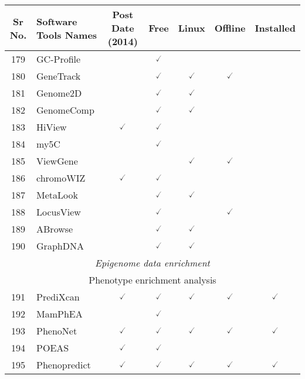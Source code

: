 \documentclass[10pt,letterpaper]{article}
\begin{document}
\begin{table}[!ht]
\begin{adjustwidth}{-2.25in}{0in} %
\centering
\begin{tabular}{|c|l|c|c|c|c|c|}
\hline
Sr No. & Software Tools Names & Post Date (2014) & Free & Linux & Offline & Installed \\ \hline
\hline
179 & GC-Profile\cite{gao2006gc} & & $\checked$ & & &  \\ 
180 & GeneTrack\cite{albert2008genetrack} & & $\checked$ & $\checked$ & $\checked$ &  \\ 
181 & Genome2D\cite{baerends2004genome2d} & & $\checked$ & $\checked$ & & \\
182 & GenomeComp\cite{yang2003genomecomp} & & $\checked$ & $\checked$ & & \\
183 & HiView\cite{xu2016hiview} & $\checked$ & $\checked$ & & & \\
184 & my5C\cite{lajoie2009my5c} & & $\checked$ & & & \\
185 & ViewGene\cite{kashuk2002viewgene} & & & $\checked$ & $\checked$ & \\
186 & chromoWIZ\cite{nussbaumer2014chromowiz} & $\checked$ & $\checked$ & & & \\
187 & MetaLook\cite{lombardot2007metalook} & & $\checked$ & $\checked$ & & \\
188 & LocusView\cite{smoller2008influence} & & $\checked$ & & $\checked$ & \\
189 & ABrowse\cite{kong2012abrowse} & & $\checked$ & $\checked$ & & \\
190 & GraphDNA\cite{thomas2007graphdna} & & $\checked$ & $\checked$ & & \\ \hline
\hline
\multicolumn{7}{|c|}{\textit{Epigenome data enrichment}} \\ \hline
\hline
\multicolumn{7}{|c|}{Phenotype enrichment analysis} \\ \hline
\hline
191 & PrediXcan\cite{gamazon2015gene} & $\checked$ & $\checked$ & $\checked$ & $\checked$ & $\checked$  \\ 
192 & MamPhEA\cite{weng2010mamphea} & & $\checked$ & & & \\ 
193 & PhenoNet\cite{ben2014phenonet} & $\checked$ & $\checked$ & $\checked$ & $\checked$ & $\checked$  \\ 
194 & POEAS\cite{shameer2014poeas} & $\checked$ & $\checked$ & & & \\ 
195 & Phenopredict\cite{ellis2018improving} & $\checked$ & $\checked$ & $\checked$ & $\checked$ & $\checked$  \\ 

\end{tabular}
\end{adjustwidth}
\end{table}
\end{document}
